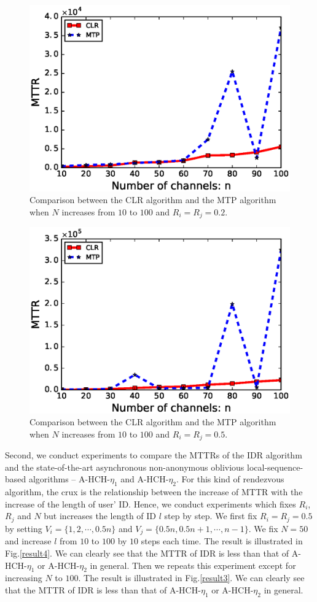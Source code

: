 \documentclass[10pt, conference, letterpaper]{IEEEtran}
\begin{document}
\begin{figure}[htbp]
\centering
\includegraphics[width=0.7\columnwidth]{fig6}
\caption{Comparison between the CLR algorithm and the MTP algorithm when $N$ increases from $10$ to $100$ and $R_i = R_j = 0.2$.}
\label{result6}
\end{figure}

\begin{figure}[htbp]
\centering
\includegraphics[width=0.7\columnwidth]{fig5}
\caption{Comparison between the CLR algorithm and the MTP algorithm when $N$ increases from $10$ to $100$ and $R_i =R_j = 0.5$.}
\label{result5}
\end{figure}
Second, we conduct experiments to compare the MTTRs of the IDR algorithm and the state-of-the-art asynchronous non-anonymous oblivious local-sequence-based algorithms -- A-HCH-$\eta_1$ and A-HCH-$\eta_2$. For this kind of rendezvous algorithm, the crux is the relationship between the increase of MTTR with the increase of the length of user' ID. Hence, we conduct experiments which fixes $R_i$, $R_j$ and $N$ but increases the length of ID $l$ step by step. We first fix $R_i = R_j = 0.5$ by setting $V_i = \{1,2,\cdots, 0.5n\}$ and $V_j = \{0.5n, 0.5n + 1, \cdots, n -1 \}$. We fix $N = 50$ and increase $l$ from $10$ to $100$ by $10$ steps each time. The result is illustrated in Fig.\ref{result4}. We can clearly see that the MTTR of IDR is less than that of A-HCH-$\eta_1$ or A-HCH-$\eta_2$ in general.
Then we repeats this experiment except for increasing $N$ to $ 100$. The result is illustrated in Fig.\ref{result3}. We can clearly see that the MTTR of IDR is less than that of A-HCH-$\eta_1$ or A-HCH-$\eta_2$ in general.
\end{document}
